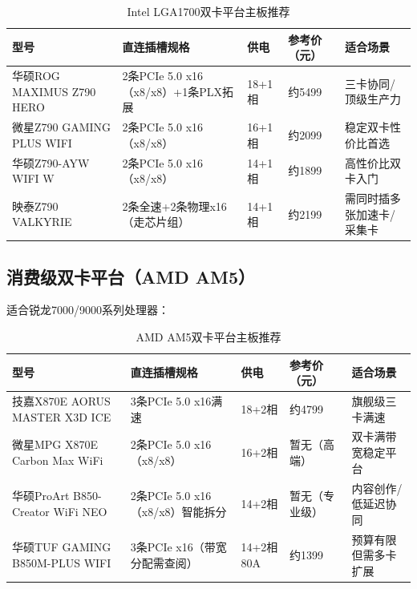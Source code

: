 \documentclass[12pt,UTF8]{ctexbook}
\begin{document}
\begin{table}[H]
    \centering
    \begin{tabular}{|p{4cm}|p{4cm}|p{2cm}|p{2cm}|p{4cm}|}
        \hline
        \textbf{型号} & \textbf{直连插槽规格} & \textbf{供电} & \textbf{参考价（元）} & \textbf{适合场景} \\
        \hline
        华硕ROG MAXIMUS Z790 HERO & 2条PCIe 5.0 x16（x8/x8）+1条PLX拓展 & 18+1相 & 约5499 & 三卡协同/顶级生产力 \\
        \hline
        微星Z790 GAMING PLUS WIFI & 2条PCIe 5.0 x16（x8/x8） & 16+1相 & 约2099 & 稳定双卡性价比首选 \\
        \hline
        华硕Z790-AYW WIFI W & 2条PCIe 5.0 x16（x8/x8） & 14+1相 & 约1899 & 高性价比双卡入门 \\
        \hline
        映泰Z790 VALKYRIE & 2条全速+2条物理x16（走芯片组） & 14+1相 & 约2199 & 需同时插多张加速卡/采集卡 \\
        \hline
    \end{tabular}
    \caption{Intel LGA1700双卡平台主板推荐}
    \label{tab:intel_dual_gpu}
\end{table}

\subsection{消费级双卡平台（AMD AM5）}

适合锐龙7000/9000系列处理器：

\begin{table}[H]
    \centering
    \begin{tabular}{|p{4cm}|p{4cm}|p{2cm}|p{2cm}|p{4cm}|}
        \hline
        \textbf{型号} & \textbf{直连插槽规格} & \textbf{供电} & \textbf{参考价（元）} & \textbf{适合场景} \\
        \hline
        技嘉X870E AORUS MASTER X3D ICE & 3条PCIe 5.0 x16满速 & 18+2相 & 约4799 & 旗舰级三卡满速 \\
        \hline
        微星MPG X870E Carbon Max WiFi & 2条PCIe 5.0 x16（x8/x8） & 16+2相 & 暂无（高端） & 双卡满带宽稳定平台 \\
        \hline
        华硕ProArt B850-Creator WiFi NEO & 2条PCIe 5.0 x16（x8/x8）智能拆分 & 14+2相 & 暂无（专业级） & 内容创作/低延迟协同 \\
        \hline
        华硕TUF GAMING B850M-PLUS WIFI & 3条PCIe x16（带宽分配需查阅） & 14+2相80A & 约1399 & 预算有限但需多卡扩展 \\
        \hline
    \end{tabular}
    \caption{AMD AM5双卡平台主板推荐}
    \label{tab:amd_dual_gpu}
\end{table}
\end{document}
